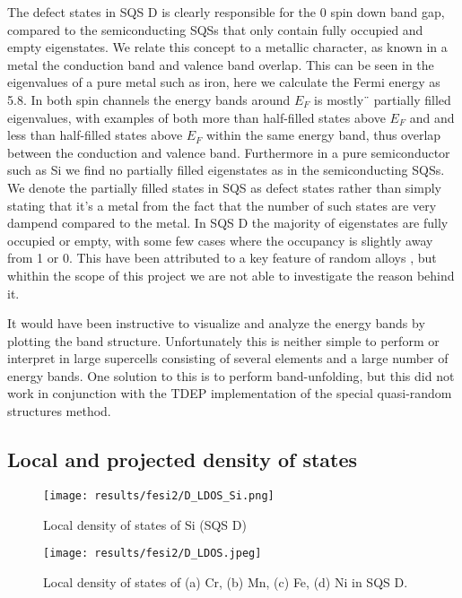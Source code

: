 The defect states in SQS D is clearly responsible for the 0 spin down band gap, compared to the semiconducting SQSs that only contain fully occupied and empty eigenstates. We relate this concept to a metallic character, as known in a metal the conduction band and valence band overlap. This can be seen in the eigenvalues of a pure metal such as iron, here we calculate the Fermi energy as 5.8. In both spin channels the energy bands around $E_F$ is mostly¨ partially filled eigenvalues, with examples of both more than half-filled states above $E_F$ and and less than half-filled states above $E_F$ within the same energy band, thus overlap between the conduction and valence band. Furthermore in a pure semiconductor such as Si we find no partially filled eigenstates as in the semiconducting SQSs. We denote the partially filled states in SQS as defect states rather than simply stating that it's a metal from the fact that the number of such states are very dampend compared to the metal. In SQS D the majority of eigenstates are fully occupied or empty, with some few cases where the occupancy is slightly away from 1 or 0. This have been attributed to a key feature of random alloys \cite{PhysRevLett.104.236403}, but whithin the scope of this project we are not able to investigate the reason behind it.      
 
It would have been instructive to visualize and analyze the energy bands by plotting the band structure. Unfortunately this is neither simple to perform or interpret in large supercells consisting of several elements and a large number of energy bands. One solution to this is to perform band-unfolding, but this did not work in conjunction with the TDEP implementation of the special quasi-random structures method.


\newpage
\subsection{Local and projected density of states}
  
\begin{figure}[H]
	\centering
	\texttt{[image: results/fesi2/D\_LDOS\_Si.png]}
	\caption{Local density of states of Si (SQS D)}
\end{figure} 

\begin{figure}[H]
	\centering
	\texttt{[image: results/fesi2/D\_LDOS.jpeg]}
	\caption{Local density of states of (a) Cr, (b) Mn, (c) Fe, (d) Ni in SQS D.}
\end{figure}   
  
